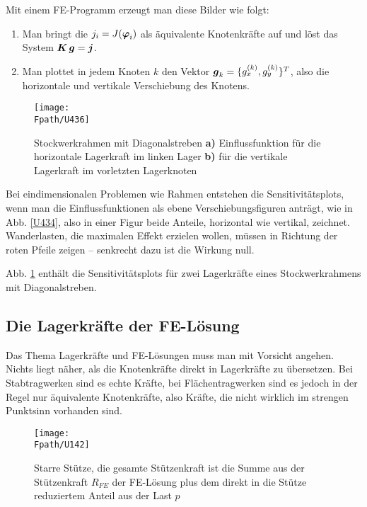 {{{\begin{remark}
Mit einem FE-Programm erzeugt man diese Bilder wie folgt:
\begin{enumerate}
  \item Man bringt die $j_i = J(\mbox{\boldmath $\varphi$}_i)$ als \"{a}quivalente Knotenkr\"{a}fte auf und l\"{o}st das System $\mbox{\boldmath $K$}\,\mbox{\boldmath $g$} = \mbox{\boldmath $j$}$.
  \item Man plottet in jedem Knoten $k$ den Vektor $\mbox{\boldmath $g$}_k = \{g_x^{(k)}, g_y^{(k)}\}^T$, also die horizontale und vertikale Verschiebung des Knotens.
\end{enumerate}
\end{remark}
\begin{figure}[tbp]
\centering
\texttt{[image: \\Fpath/U436]}
\caption{Stockwerkrahmen mit Diagonalstreben \textbf{ a)} Einflussfunktion f\"{u}r die horizontale Lagerkraft im linken Lager \textbf{ b)} f\"{u}r die vertikale Lagerkraft im vorletzten Lagerknoten} \label{U436}
\end{figure}%

Bei eindimensionalen Problemen wie Rahmen entstehen die Sensitivit\"{a}tsplots, wenn man die Einflussfunktionen als ebene Verschiebungsfiguren antr\"{a}gt, wie in Abb. \ref{U434}, also in einer Figur beide Anteile, horizontal wie vertikal, zeichnet. Wanderlasten, die maximalen Effekt erzielen wollen, m\"{u}ssen in Richtung der roten Pfeile zeigen -- senkrecht dazu ist die Wirkung null.

Abb. \ref{U436} enth\"{a}lt die Sensitivit\"{a}tsplots f\"{u}r zwei Lagerkr\"{a}fte eines Stockwerkrahmens mit  Diagonalstreben.


{\textcolor{sectionTitleBlue}{\section{Die Lagerkr\"{a}fte der FE-L\"{o}sung}}}\label{Korrektur20}
Das Thema Lagerkr\"{a}fte und FE-L\"{o}sungen muss man mit Vorsicht angehen. Nichts liegt n\"{a}her, als die Knotenkr\"{a}fte direkt in Lagerkr\"{a}fte zu \"{u}bersetzen. Bei Stabtragwerken sind es echte Kr\"{a}fte, bei Fl\"{a}chentragwerken sind es jedoch in der Regel nur \"{a}quivalente Knotenkr\"{a}fte, also Kr\"{a}fte, die nicht wirklich im strengen Punktsinn vorhanden sind.

\begin{figure}[tbp]
\centering
\texttt{[image: \\Fpath/U142]}
\caption{Starre St\"{u}tze, die gesamte St\"{u}tzenkraft ist die Summe aus der St\"{u}tzenkraft $R_{FE}$ der FE-L\"{o}sung plus dem direkt in die St\"{u}tze reduziertem Anteil aus der Last $p$} \label{U142}
\end{figure}%

}}}
